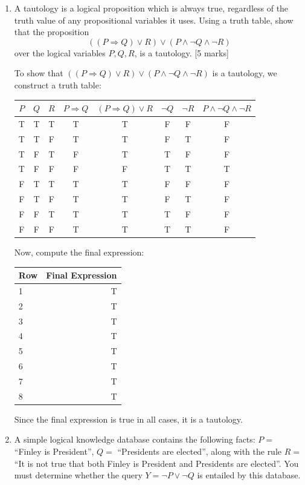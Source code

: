 \begin{enumerate}
    \item[(c)] A tautology is a logical proposition which is always true, regardless of the truth value of any propositional variables it uses. Using a truth table, show that the proposition 
    \[
    ((P \Rightarrow Q) \lor R) \lor (P \land \lnot Q \land \lnot R)
    \]
    over the logical variables $P,Q,R$, is a tautology. [5 marks] \\
    {\color{blue}
    To show that $((P \Rightarrow Q) \lor R) \lor (P \land \lnot Q \land \lnot R)$ is a tautology, we construct a truth table:

    \begin{tabular}{|c|c|c|c|c|c|c|c|}
    \hline
    $P$ & $Q$ & $R$ & $P \Rightarrow Q$ & $(P \Rightarrow Q) \lor R$ & $\lnot Q$ & $\lnot R$ & $P \land \lnot Q \land \lnot R$ \\
    \hline
    T & T & T & T & T & F & F & F \\
    T & T & F & T & T & F & T & F \\
    T & F & T & F & T & T & F & F \\
    T & F & F & F & F & T & T & T \\
    F & T & T & T & T & F & F & F \\
    F & T & F & T & T & F & T & F \\
    F & F & T & T & T & T & F & F \\
    F & F & F & T & T & T & T & F \\
    \hline
    \end{tabular}

    Now, compute the final expression:

    \begin{tabular}{|l|r|}
    \hline
    Row & Final Expression \\
    \hline
    1 & T \\
    2 & T \\
    3 & T \\
    4 & T \\
    5 & T \\
    6 & T \\
    7 & T \\
    8 & T \\
    \hline
    \end{tabular}

    Since the final expression is true in all cases, it is a tautology.
    }
    \item[(d)] A simple logical knowledge database contains the following facts: $P =$ “Finley is President”, $Q =$ “Presidents are elected”, along with the rule $R =$ “It is not true that both Finley is President and Presidents are elected”. You must determine whether the query $Y = \lnot P \lor \lnot Q$ is entailed by this database.
    

\end{enumerate}
